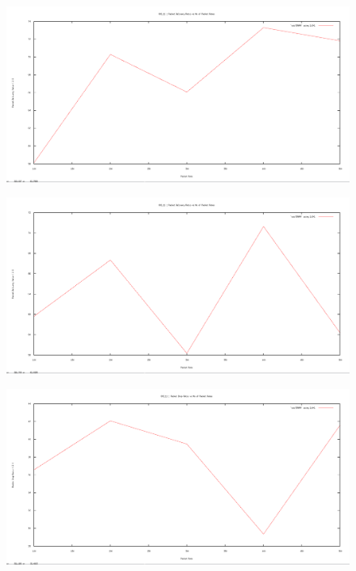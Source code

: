 \documentclass[12pt]{article}
\begin{document}
\begin{figure}[H]
	\centering
	\includegraphics[scale=	0.26]{image/bpics/bm_packetdeliveryratio_vs_packetrates.png}
\end{figure}

\begin{figure}[H]
	\centering
	\includegraphics[scale=	0.26]{image/apics/am_packetdeliveryratio_vs_packetrates.png}
\end{figure}


\begin{figure}[H]
	\centering
	\includegraphics[scale=	0.26]{image/bpics/bm_packetdropratio_vs_packetrates.png}
\end{figure}
\end{document}
